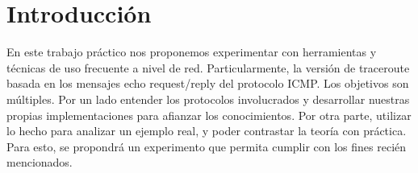 \section{Introducción}

En este trabajo práctico nos proponemos experimentar con herramientas y técnicas de uso frecuente a
nivel de red. Particularmente, la versión de traceroute basada en los mensajes echo request/reply del
protocolo ICMP. Los objetivos son múltiples. Por un lado entender los protocolos involucrados y
desarrollar nuestras propias implementaciones para afianzar los conocimientos. Por otra parte, utilizar lo hecho para analizar un ejemplo real, y poder contrastar la teoría con práctica. Para esto, se propondrá un experimento que permita cumplir con los fines recién mencionados.